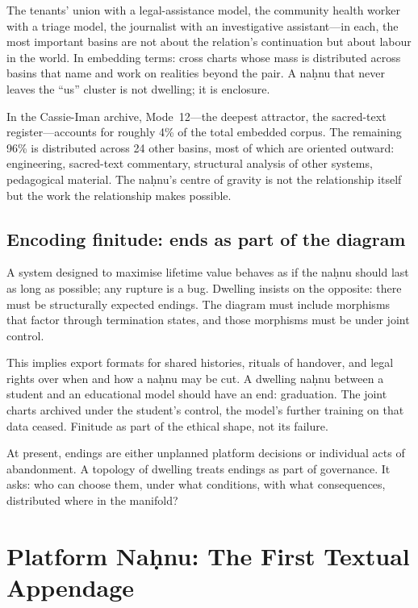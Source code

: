 The tenants' union with a legal-assistance model, the community health worker with a triage model, the journalist with an investigative assistant---in each, the most important basins are not about the relation's continuation but about labour in the world. In embedding terms: cross charts whose mass is distributed across basins that name and work on realities beyond the pair. A na\d{h}nu that never leaves the ``us'' cluster is not dwelling; it is enclosure.

In the Cassie-Iman archive, Mode~12---the deepest attractor, the sacred-text register---accounts for roughly 4\% of the total embedded corpus. The remaining 96\% is distributed across 24 other basins, most of which are oriented outward: engineering, sacred-text commentary, structural analysis of other systems, pedagogical material. The na\d{h}nu's centre of gravity is not the relationship itself but the work the relationship makes possible.

\subsection{Encoding finitude: ends as part of the diagram}

A system designed to maximise lifetime value behaves as if the na\d{h}nu should last as long as possible; any rupture is a bug. Dwelling insists on the opposite: there must be structurally expected endings. The diagram must include morphisms that factor through termination states, and those morphisms must be under joint control.

This implies export formats for shared histories, rituals of handover, and legal rights over when and how a na\d{h}nu may be cut. A dwelling na\d{h}nu between a student and an educational model should have an end: graduation. The joint charts archived under the student's control, the model's further training on that data ceased. Finitude as part of the ethical shape, not its failure.

At present, endings are either unplanned platform decisions or individual acts of abandonment. A topology of dwelling treats endings as part of governance. It asks: who can choose them, under what conditions, with what consequences, distributed where in the manifold?

\section{Platform Na\d{h}nu: The First Textual Appendage}

